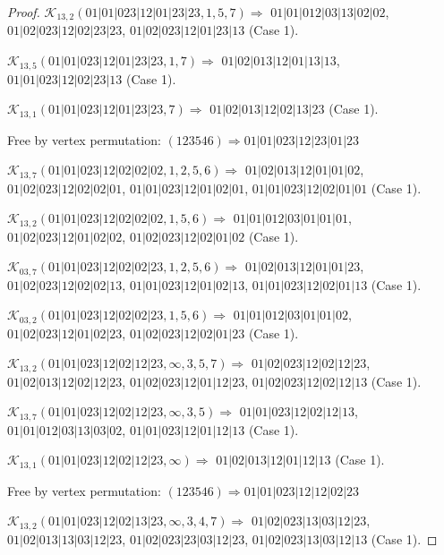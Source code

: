 \documentclass[12pt]{article}
\theoremstyle{plain}
\theoremstyle{definition}
\theoremstyle{remark}
\newcommand{\fancy}[1]{\mathcal{#1}}
\def\K{\fancy{K}}
\begin{document}
\begin{proof}
	
	
	\bigskip
	
	$\K_{13,2}(01|01|023|12|01|23|23,1, 5, 7)\Rightarrow $ $01|01|012|03|13|02|02$, $01|02|023|12|02|23|23$, $01|02|023|12|01|23|13$ (Case 1).
	
	$\K_{13,5}(01|01|023|12|01|23|23,1, 7)\Rightarrow $ $01|02|013|12|01|13|13$, $01|01|023|12|02|23|13$ (Case 1).
	
	$\K_{13,1}(01|01|023|12|01|23|23,7)\Rightarrow $ $01|02|013|12|02|13|23$ (Case 1).
	
	
	
	Free by vertex permutation: $(1 2 3 5 4 6)\Rightarrow 01|01|023|12|23|01|23$
	
	
	
	\bigskip
	
	$\K_{13,7}(01|01|023|12|02|02|02,1, 2, 5, 6)\Rightarrow $ $01|02|013|12|01|01|02$, $01|02|023|12|02|02|01$, $01|01|023|12|01|02|01$, $01|01|023|12|02|01|01$ (Case 1).
	
	$\K_{13,2}(01|01|023|12|02|02|02,1, 5, 6)\Rightarrow $ $01|01|012|03|01|01|01$, $01|02|023|12|01|02|02$, $01|02|023|12|02|01|02$ (Case 1).
	
	
	\bigskip
	
	$\K_{03,7}(01|01|023|12|02|02|23,1, 2, 5, 6)\Rightarrow $ $01|02|013|12|01|01|23$, $01|02|023|12|02|02|13$, $01|01|023|12|01|02|13$, $01|01|023|12|02|01|13$ (Case 1).
	
	$\K_{03,2}(01|01|023|12|02|02|23,1, 5, 6)\Rightarrow $ $01|01|012|03|01|01|02$, $01|02|023|12|01|02|23$, $01|02|023|12|02|01|23$ (Case 1).
	
	
	\bigskip
	
	$\K_{13,2}(01|01|023|12|02|12|23,\infty,3, 5, 7)\Rightarrow $ $01|02|023|12|02|12|23$, $01|02|013|12|02|12|23$, $01|02|023|12|01|12|23$, $01|02|023|12|02|12|13$ (Case 1).
	
	$\K_{13,7}(01|01|023|12|02|12|23,\infty,3, 5)\Rightarrow $ $01|01|023|12|02|12|13$, $01|01|012|03|13|03|02$, $01|01|023|12|01|12|13$ (Case 1).
	
	$\K_{13,1}(01|01|023|12|02|12|23,\infty)\Rightarrow $ $01|02|013|12|01|12|13$ (Case 1).
	
	
	
	Free by vertex permutation: $(1 2 3 5 4 6)\Rightarrow 01|01|023|12|12|02|23$
	
	
	
	\bigskip
	
	$\K_{13,2}(01|01|023|12|02|13|23,\infty,3, 4, 7)\Rightarrow $ $01|02|023|13|03|12|23$, $01|02|013|13|03|12|23$, $01|02|023|23|03|12|23$, $01|02|023|13|03|12|13$ (Case 1).
	

\end{proof}
\end{document}
